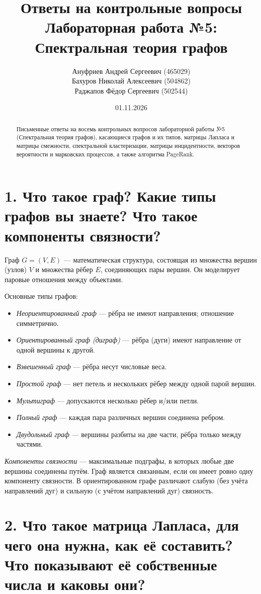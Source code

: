 \documentclass[12pt,a4paper]{article}
\title{Ответы на контрольные вопросы\\
Лабораторная работа №5: Спектральная теория графов}
\author{Ануфриев Андрей Сергеевич (465029) \\ Бахуров Николай Алексеевич (504862) \\ Раджапов Фёдор Сергеевич (502544)}
\date{01.11.2026}
\begin{document}
\maketitle

\begin{abstract}
Письменные ответы на восемь контрольных вопросов лабораторной работы №5 (Спектральная теория графов), касающиеся графов и их типов, матрицы Лапласа и матрицы смежности, спектральной кластеризации, матрицы инцидентности, векторов вероятности и марковских процессов, а также алгоритма PageRank.
\end{abstract}

\section*{1. Что такое граф? Какие типы графов вы знаете? Что такое компоненты связности?}

Граф $G=(V,E)$ --- математическая структура, состоящая из множества вершин (узлов) $V$ и множества рёбер $E$, соединяющих пары вершин. Он моделирует паровые отношения между объектами.

Основные типы графов:
\begin{itemize}
    \item \emph{Неориентированный граф} --- рёбра не имеют направления; отношение симметрично.
    \item \emph{Ориентированный граф (диграф)} --- рёбра (дуги) имеют направление от одной вершины к другой.
    \item \emph{Взвешенный граф} --- рёбра несут числовые веса.
    \item \emph{Простой граф} --- нет петель и нескольких рёбер между одной парой вершин.
    \item \emph{Мультиграф} --- допускаются несколько рёбер и/или петли.
    \item \emph{Полный граф} --- каждая пара различных вершин соединена ребром.
    \item \emph{Двудольный граф} --- вершины разбиты на две части, рёбра только между частями.
\end{itemize}

\emph{Компоненты связности} --- максимальные подграфы, в которых любые две вершины соединены путём. Граф является связанным, если он имеет ровно одну компоненту связности. В ориентированном графе различают слабую (без учёта направлений дуг) и сильную (с учётом направлений дуг) связность.

\section*{2. Что такое матрица Лапласа, для чего она нужна, как её составить? Что показывают её собственные числа и каковы они?}
\end{document}
